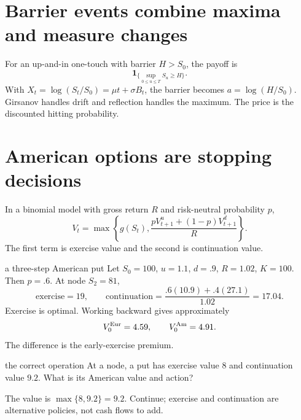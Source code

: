 \documentclass[10pt]{article}
\begin{document}
\section{Barrier events combine maxima and measure changes}
For an up-and-in one-touch with barrier \(H>S_0\), the payoff is
\[
\mathbf 1_{\{\sup_{0\leq u\leq T}S_u\geq H\}}.
\]
With \(X_t=\log(S_t/S_0)=\mu t+\sigma B_t\), the barrier becomes
\(a=\log(H/S_0)\). Girsanov handles drift and reflection handles the maximum.
The price is the discounted hitting probability.

\section{American options are stopping decisions}
In a binomial model with gross return \(R\) and risk-neutral probability
\(p\),
\[
\boxed{V_t=\max\left\{g(S_t),
\frac{pV_{t+1}^u+(1-p)V_{t+1}^d}{R}\right\}.}
\]
The first term is exercise value and the second is continuation value.
\begin{boardexample}{a three-step American put}
Let \(S_0=100\), \(u=1.1\), \(d=.9\), \(R=1.02\), \(K=100\). Then
\(p=.6\). At node \(S_2=81\),
\[
\text{exercise}=19,\qquad
\text{continuation}=\frac{.6(10.9)+.4(27.1)}{1.02}=17.04.
\]
Exercise is optimal. Working backward gives approximately
\[
V_0^{\rm Eur}=4.59,\qquad V_0^{\rm Am}=4.91.
\]
The difference is the early-exercise premium.
\end{boardexample}

\begin{studentexercise}{the correct operation}
At a node, a put has exercise value \(8\) and continuation value \(9.2\).
What is its American value and action?
\end{studentexercise}
\begin{shortsolution}
The value is \(\max\{8,9.2\}=9.2\). Continue; exercise and continuation
are alternative policies, not cash flows to add.
\end{shortsolution}
\end{document}
